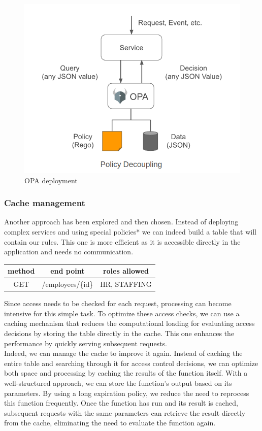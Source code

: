 \documentclass[12pt,a4paper,table,english]{article}
\begin{document}
	\begin{figure}[H]
		\includegraphics[width=150mm]{Image/OPA}
		\caption{OPA deployment}
		\label{fig:OPA deployment}
	\end{figure}
	
	\pagebreak
	\subsubsection{Cache management}
	
	Another approach has been explored and then chosen. Instead of deploying complex services and using special policies* we can indeed build a table that will contain our rules. This one is more efficient as it is accessible directly in the application and needs no communication.
	
	\begin{center}
		\begin{tabular}{| c | c | c |}
			\hline
			method & end point & roles allowed\\ \hline
			GET & /employees/\{id\} & HR, STAFFING\\
			\hline
		\end{tabular}
	\end{center}
	
	\noindent Since access needs to be checked for each request, processing can become intensive for this simple task. To optimize these access checks, we can use a caching mechanism that reduces the computational loading for evaluating access decisions by storing the table directly in the cache. This one enhances the performance by quickly serving subsequent requests.\\
	Indeed, we can manage the cache to improve it again. 
	Instead of caching the entire table and searching through it for access control decisions, we can optimize both space and processing by caching the results of the function itself. With a well-structured approach, we can store the function's output based on its parameters. By using a long expiration policy, we reduce the need to reprocess this function frequently. Once the function has run and its result is cached, subsequent requests with the same parameters can retrieve the result directly from the cache, eliminating the need to evaluate the function again.
	
\end{document}
